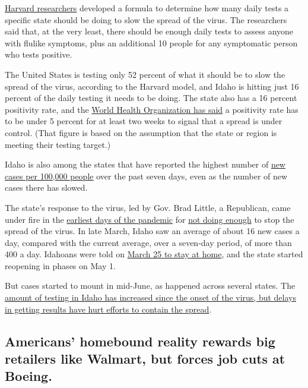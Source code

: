 \href{https://globalepidemics.org/july-6-2020-state-testing-targets/}{Harvard
researchers} developed a formula to determine how many daily tests a
specific state should be doing to slow the spread of the virus. The
researchers said that, at the very least, there should be enough daily
tests to assess anyone with flulike symptoms, plus an additional 10
people for any symptomatic person who tests positive.

The United States is testing only 52 percent of what it should be to
slow the spread of the virus, according to the Harvard model, and Idaho
is hitting just 16 percent of the daily testing it needs to be doing.
The state also has a 16 percent positivity rate, and the
\href{https://www.azcentral.com/story/news/local/arizona-health/2020/07/07/why-arizonas-percent-positive-tests-highest-country/5386600002/}{World
Health Organization has said} a positivity rate has to be under 5
percent for at least two weeks to signal that a spread is under control.
(That figure is based on the assumption that the state or region is
meeting their testing target.)

Idaho is also among the states that have reported the highest number of
\href{https://www.nytimes3xbfgragh.onion/interactive/2020/us/coronavirus-us-cases.html}{new
cases per 100,000 people} over the past seven days, even as the number
of new cases there has slowed.

The state's response to the virus, led by Gov. Brad Little, a
Republican, came under fire in the
\href{https://www.idahostatesman.com/entertainment/ent-columns-blogs/words-deeds/article241471176.html}{earliest
days of the pandemic} for
\href{https://www.idahostatesman.com/opinion/editorials/article241458021.html}{not
doing enough} to stop the spread of the virus. In late March, Idaho saw
an average of about 16 new cases a day, compared with the current
average, over a seven-day period, of more than 400 a day. Idahoans were
told on
\href{https://www.nytimes3xbfgragh.onion/interactive/2020/us/coronavirus-stay-at-home-order.html}{March
25 to stay at home}, and the state started reopening in phases on May 1.

But cases started to mount in mid-June, as happened across several
states. The
\href{https://www.idahostatesman.com/article244586032.html}{amount of
testing in Idaho has increased since the onset of the virus, but delays
in getting results have hurt efforts to contain the spread}.

\hypertarget{americans-homebound-reality-rewards-big-retailers-like-walmart-but-forces-job-cuts-at-boeing}{%
\subsection{Americans' homebound reality rewards big retailers like
Walmart, but forces job cuts at
Boeing.}\label{americans-homebound-reality-rewards-big-retailers-like-walmart-but-forces-job-cuts-at-boeing}}

